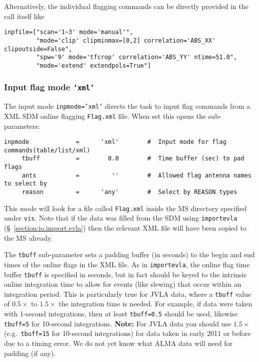 Alternatively, the individual flagging commands can
be directly provided in the call itself like 
\small
\begin{verbatim}
inpfile=["scan='1~3' mode='manual'", 
         "mode='clip' clipminmax=[0,2] correlation='ABS_XX' clipoutside=False",
         "spw='9' mode='tfcrop' correlation='ABS_YY' ntime=51.0",
         "mode='extend' extendpols=True"]
\end{verbatim}
\normalsize



\subsubsection{Input flag mode {\tt 'xml'}}
\label{section:edit.flagcmd.inpmode.xml}

The input mode {\tt inpmode='xml'} directs the
task to input flag commands from a XML SDM online flagging 
{\tt Flag.xml} file.  
When set this opens the sub-parameters:
\small
\begin{verbatim}
inpmode             =      'xml'        #  Input mode for flag commands(table/list/xml)
     tbuff          =        0.0        #  Time buffer (sec) to pad flags
     ants           =         ''        #  Allowed flag antenna names to select by
     reason         =      'any'        #  Select by REASON types
\end{verbatim}
\normalsize

This mode will look for a file called {\tt Flag.xml} inside the MS
directory specified under {\tt vis}.  Note that if the data was filled
from the SDM using {\tt importevla} (\S~\ref{section:io.import.evla})
then the relevant XML file will have been copied to the MS already.

The {\tt tbuff} sub-parameter sets a padding buffer (in seconds)
to the begin and end times of the online flags in the XML file.
As in {\tt importevla}, the online flag time buffer {\tt tbuff} is specified in
seconds, but in fact should be keyed to the intrinsic online 
integration time to allow for events (like slewing) that occur
within an integration period.  This is particularly true for JVLA data,
where a {\tt tbuff} value of $0.5\times$ to $1.5\times$ the
integration time is needed.  For example, if data were taken with
1-second integrations, then at least {\tt tbuff=0.5} should be used,
likewise {\tt tbuff=5} for 10-second integrations.
{\bf Note:} For JVLA data you should use $1.5\times$ (e.g.\ 
{\tt tbuff=15} for 10-second integrations) for data taken in 
early 2011 or before due to a timing error.  We do not yet know what
ALMA data will need for padding (if any).

